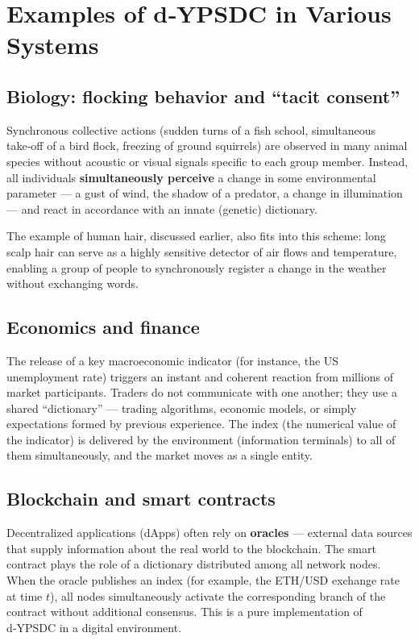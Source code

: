 \documentclass[12pt,a4paper]{article}
\begin{document}
	\section{Examples of d‑YPSDC in Various Systems}
	
	\subsection{Biology: flocking behavior and “tacit consent”}
	
	Synchronous collective actions (sudden turns of a fish school, simultaneous take‑off of a bird flock, freezing of ground squirrels) are observed in many animal species without acoustic or visual signals specific to each group member. Instead, all individuals \textbf{simultaneously perceive} a change in some environmental parameter — a gust of wind, the shadow of a predator, a change in illumination — and react in accordance with an innate (genetic) dictionary.
	
	The example of human hair, discussed earlier, also fits into this scheme: long scalp hair can serve as a highly sensitive detector of air flows and temperature, enabling a group of people to synchronously register a change in the weather without exchanging words.
	
	\subsection{Economics and finance}
	
	The release of a key macroeconomic indicator (for instance, the US unemployment rate) triggers an instant and coherent reaction from millions of market participants. Traders do not communicate with one another; they use a shared “dictionary” — trading algorithms, economic models, or simply expectations formed by previous experience. The index (the numerical value of the indicator) is delivered by the environment (information terminals) to all of them simultaneously, and the market moves as a single entity.
	
	\subsection{Blockchain and smart contracts}
	
	Decentralized applications (dApps) often rely on \textbf{oracles} — external data sources that supply information about the real world to the blockchain. The smart contract plays the role of a dictionary distributed among all network nodes. When the oracle publishes an index (for example, the ETH/USD exchange rate at time \(t\)), all nodes simultaneously activate the corresponding branch of the contract without additional consensus. This is a pure implementation of d‑YPSDC in a digital environment.
	
\end{document}
